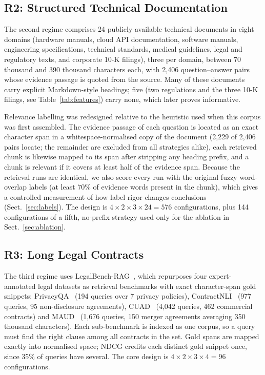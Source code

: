 \documentclass[runningheads]{llncs}
\begin{document}
\subsection{R2: Structured Technical Documentation}
\label{sec:r2}
The second regime comprises 24 publicly available technical documents in eight domains (hardware manuals, cloud API documentation, software manuals, engineering specifications, technical standards, medical guidelines, legal and regulatory texts, and corporate 10-K filings), three per domain, between 70 thousand and 390 thousand characters each, with 2,406 question--answer pairs whose evidence passage is quoted from the source. Many of these documents carry explicit Markdown-style headings; five (two regulations and the three 10-K filings, see Table~\ref{tab:features}) carry none, which later proves informative.

Relevance labelling was redesigned relative to the heuristic used when this corpus was first assembled. The evidence passage of each question is located as an exact character span in a whitespace-normalised copy of the document (2,229 of 2,406 pairs locate; the remainder are excluded from all strategies alike), each retrieved chunk is likewise mapped to its span after stripping any heading prefix, and a chunk is relevant if it covers at least half of the evidence span. Because the retrieval runs are identical, we also score every run with the original fuzzy word-overlap labels (at least 70\% of evidence words present in the chunk), which gives a controlled measurement of how label rigor changes conclusions (Sect.~\ref{sec:labels}). The design is $4\times2\times3\times24=576$ configurations, plus 144 configurations of a fifth, no-prefix strategy used only for the ablation in Sect.~\ref{sec:ablation}.

\subsection{R3: Long Legal Contracts}
\label{sec:r3}
The third regime uses LegalBench-RAG~\cite{pipitone2024legalbenchrag}, which repurposes four expert-annotated legal datasets as retrieval benchmarks with exact character-span gold snippets: PrivacyQA~\cite{ravichander2019privacyqa} (194 queries over 7 privacy policies), ContractNLI~\cite{koreeda2021contractnli} (977 queries, 95 non-disclosure agreements), CUAD~\cite{hendrycks2021cuad} (4,042 queries, 462 commercial contracts) and MAUD~\cite{wang2023maud} (1,676 queries, 150 merger agreements averaging 350 thousand characters). Each sub-benchmark is indexed as one corpus, so a query must find the right clause among all contracts in the set. Gold spans are mapped exactly into normalised space; NDCG credits each distinct gold snippet once, since 35\% of queries have several. The core design is $4\times2\times3\times4=96$ configurations.
\end{document}
